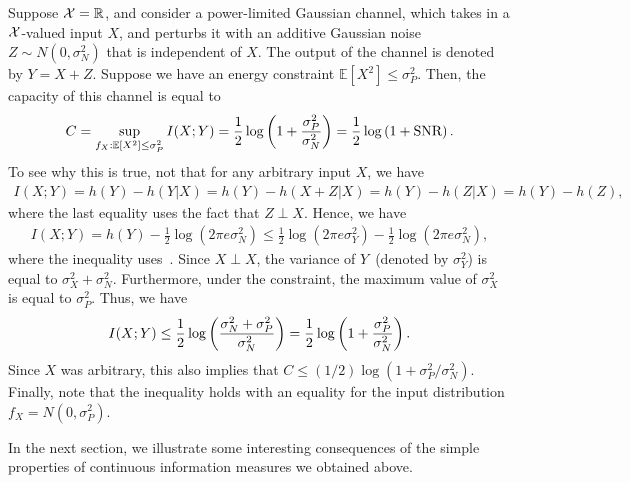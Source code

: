             \begin{example} 
                \label{ex:gaussian-channel-capacity} Suppose $\mathcal{X} = \mathbb{R}$, and consider a power-limited Gaussian channel, which takes in a $\mathcal{X}$-valued input $X$, and perturbs it with  an additive Gaussian noise $Z \sim N(0, \sigma_N^2)$ that is independent of $X$. The output of the channel is denoted by $Y= X+Z$. Suppose we have an energy constraint $\mathbb{E}[X^2] \leq \sigma_P^2$. Then, the capacity of this channel is equal to 
                \begin{align}
                    C = \sup_{f_X: \mathbb{E}[X^2] \leq \sigma_P^2} I(X; Y) = \frac{1}{2} \log \left( 1 + \frac{\sigma_P^2}{\sigma_N^2} \right) = \frac{1}{2} \log \left( 1 + \text{SNR} \right). 
                \end{align}
                To see why this is true, not that for any arbitrary input $X$, we have 
                \begin{align}
                    I(X;Y) = h(Y) - h(Y|X) = h(Y) - h(X+Z|X) = h(Y) - h(Z|X) = h(Y) - h(Z), 
                \end{align}
                where the last equality uses the fact that $Z \perp X$. Hence, we have 
                \begin{align}
                    I(X;Y) = h(Y) - \frac{1}{2} \log (2\pi e \sigma_N^2) \leq \frac{1}{2} \log (2 \pi e \sigma_Y^2) - \frac{1}{2} \log (2 \pi e \sigma_N^2),
                \end{align}
                where the inequality uses~. Since $X \perp X$, the variance of $Y$~(denoted by $\sigma_Y^2$) is equal to $\sigma_X^2 + \sigma_N^2$. Furthermore, under the constraint, the maximum value of $\sigma_X^2$ is equal to $\sigma_P^2$. Thus, we have 
                \begin{align}
                    I(X;Y) \leq \frac{1}{2} \log \left( \frac{\sigma_N^2 + \sigma_P^2}{\sigma_N^2} \right) = \frac{1}{2} \log \left( 1 + \frac{\sigma_P^2}{\sigma_N^2} \right). 
                \end{align}
                Since $X$ was arbitrary, this also implies that $C \leq (1/2) \log(1 + \sigma_P^2/\sigma_N^2)$. Finally, note that the inequality holds with an equality for the input distribution $f_X = N(0, \sigma_P^2)$. 
            \end{example}
            
            In the next section, we illustrate some interesting consequences of the simple properties of continuous information measures we obtained above. 
